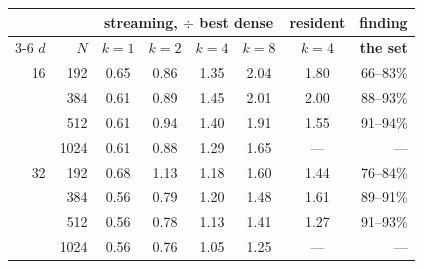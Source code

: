 \begin{tabular}{rrcccccr}
\toprule
& & \multicolumn{4}{c}{\textbf{streaming}, $\div$ best dense} & \textbf{resident} & \textbf{finding} \\
\cmidrule(lr){3-6}
$d$ & $N$ & $k{=}1$ & $k{=}2$ & $k{=}4$ & $k{=}8$ & $k{=}4$ & \textbf{the set} \\
\midrule
16 & 192 & 0.65 & 0.86 & 1.35 & 2.04 & 1.80 & 66--83\% \\
 & 384 & 0.61 & 0.89 & 1.45 & 2.01 & 2.00 & 88--93\% \\
 & 512 & 0.61 & 0.94 & 1.40 & 1.91 & 1.55 & 91--94\% \\
 & 1024 & 0.61 & 0.88 & 1.29 & 1.65 & --- & --- \\
\midrule
32 & 192 & 0.68 & 1.13 & 1.18 & 1.60 & 1.44 & 76--84\% \\
 & 384 & 0.56 & 0.79 & 1.20 & 1.48 & 1.61 & 89--91\% \\
 & 512 & 0.56 & 0.78 & 1.13 & 1.41 & 1.27 & 91--93\% \\
 & 1024 & 0.56 & 0.76 & 1.05 & 1.25 & --- & --- \\
\bottomrule
\end{tabular}%
